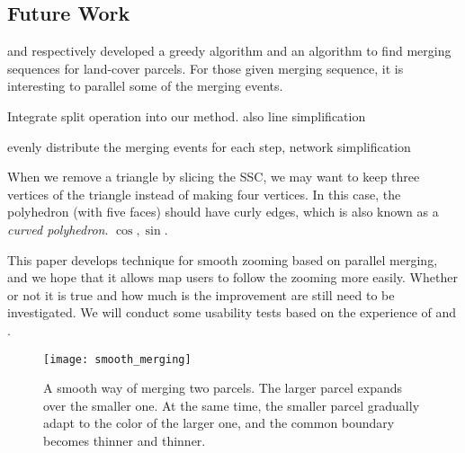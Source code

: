 \documentclass[ijgi,article,submit,moreauthors,pdftex]{Definitions/mdpi}
\begin{document}
\subsection{Future Work}

\citet{vanOosterom2005} and \citet[]{Peng2019Thesis}
respectively developed a greedy algorithm and an \Astar algorithm to find
merging sequences for land-cover parcels.
For those given merging sequence,
it is interesting to parallel some of the merging events.

Integrate split operation into our method. also line simplification

evenly distribute the merging events for each step, 
network simplification

When we remove a triangle by slicing the SSC, 
we may want to keep three vertices of the triangle 
instead of making four vertices.
In this case, the polyhedron (with five faces) should have curly edges,
which is also known as a \emph{curved polyhedron}.
$\cos, \sin$.

This paper develops technique for smooth zooming based on parallel merging,
and we hope that it allows map users to follow the zooming more easily.
Whether or not it is true and how much is the improvement 
are still need to be investigated.
We will conduct some usability tests based on the experience of
\citet[]{Suba2017Thesis} and \citet{Midtbo2007}.

\begin{figure}[tb]
\centering
\texttt{[image: smooth\_merging]}
\caption{A smooth way of merging two parcels.
    The larger parcel expands over the smaller one.
    At the same time, 
    the smaller parcel gradually adapt to the color of the larger one,
    and the common boundary becomes thinner and thinner.}
\label{fig:smooth_merging_future}
\end{figure}




\end{document}
